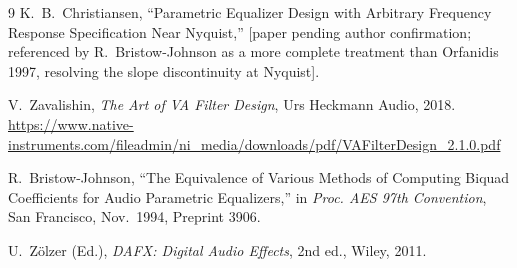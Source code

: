 \documentclass[twocolumn]{article}
\begin{document}
\begin{thebibliography}{9}
K.~B.~Christiansen, ``Parametric Equalizer Design with Arbitrary Frequency
Response Specification Near Nyquist,'' [paper pending author confirmation;
referenced by R.~Bristow-Johnson as a more complete treatment than Orfanidis
1997, resolving the slope discontinuity at Nyquist].

V.~Zavalishin, \textit{The Art of VA Filter Design}, Urs Heckmann Audio, 2018.
\url{https://www.native-instruments.com/fileadmin/ni_media/downloads/pdf/VAFilterDesign_2.1.0.pdf}

R.~Bristow-Johnson, ``The Equivalence of Various Methods of Computing Biquad
Coefficients for Audio Parametric Equalizers,''
in \textit{Proc. AES 97th Convention}, San Francisco, Nov.\ 1994, Preprint 3906.

U.~Z{\"o}lzer (Ed.), \textit{DAFX: Digital Audio Effects}, 2nd ed.,
Wiley, 2011.
\end{thebibliography}
\end{document}
